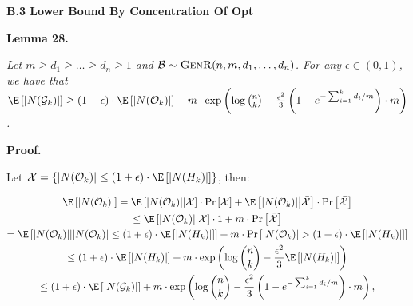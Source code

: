 \par\medskip\noindent\textbf{B.3 Lower Bound By Concentration Of Opt}\par





\par\medskip\noindent\textbf{\textbf{Lemma 28}\textbf{.}}\par



\emph{Let $m\geq d_{1}\geq\dots\geq d_{n}\geq 1$ and $\mathcal{B}\sim\textsc{GenR}(n,m,d_{1},\dots,d_{n})$.
For any $\epsilon\in(0,1)$, we have that
$\E\left[|N(\mathcal{G}_{k})|\right]\geq(1-\epsilon)\cdot\E\left[|N(\mathcal{O}_{k})|\right]-m\cdot\exp\left(\log\binom{n}{k}-\frac{\epsilon^{2}}{3}\left(1-e^{-\sum_{i=1}^{k}d_{i}/m}\right)\cdot m\right)$.}\par






\par\medskip\noindent\textbf{Proof.}\par



Let $\mathcal{X}=\{|N(\mathcal{O}_{k})|\leq(1+\epsilon)\cdot\E\left[|N(H_{k})|\right]\}$, then:\par


\[\begin{gathered}
\displaystyle\E\left[|N(\mathcal{O}_{k})|\right] \displaystyle=\E\left[|N(\mathcal{O}_{k})|\middle|\mathcal{X}\right]\cdot\Pr\left[\mathcal{X}\right]+\E\left[|N(\mathcal{O}_{k})|\middle|\bar{\mathcal{X}}\right]\cdot\Pr\left[\bar{\mathcal{X}}\right] \\
\displaystyle\leq\E\left[|N(\mathcal{O}_{k})|\middle|\mathcal{X}\right]\cdot 1+m\cdot\Pr\left[\bar{\mathcal{X}}\right] \\
\displaystyle=\E\left[|N(\mathcal{O}_{k})|\middle||N(\mathcal{O}_{k})|\leq(1+\epsilon)\cdot\E\left[|N(H_{k})|\right]\right]+m\cdot\Pr\left[|N(\mathcal{O}_{k})|>(1+\epsilon)\cdot\E\left[|N(H_{k})|\right]\right] \\
\displaystyle\leq(1+\epsilon)\cdot\E\left[|N(H_{k})|\right]+m\cdot\exp\left(\log{\binom{n}{k}}-\frac{\epsilon^{2}}{3}\E\left[|N(H_{k})|\right]\right) \\
\displaystyle\leq(1+\epsilon)\cdot\E\left[|N(\mathcal{G}_{k})|\right]+m\cdot\exp\left(\log{\binom{n}{k}}-\frac{\epsilon^{2}}{3}\left(1-e^{-\sum_{i=1}^{k}d_{i}/m}\right)\cdot m\right),
\end{gathered}\]


